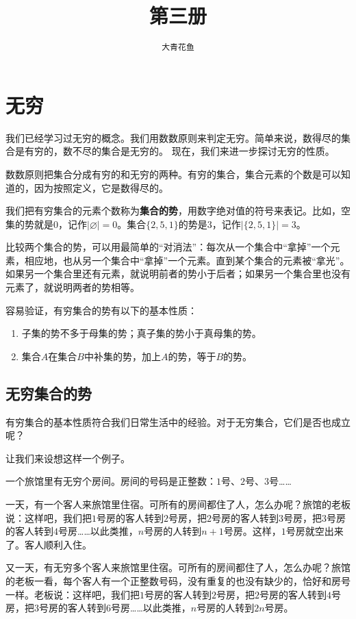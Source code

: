 \documentclass[12pt,UTF8]{ctexbook}
\title{\zihao{0} \bfseries 第三册}
\author{\zihao{2} \texttt{大青花鱼}}
\date{}
\begin{document}
\maketitle
\tableofcontents
\newpage

\chapter{无穷}

我们已经学习过无穷的概念。我们用数数原则来判定无穷。简单来说，数得尽的集合是有穷的，数不尽的集合是无穷的。
现在，我们来进一步探讨无穷的性质。

数数原则把集合分成有穷的和无穷的两种。有穷的集合，集合元素的个数是可以知道的，因为按照定义，它是数得尽的。

我们把有穷集合的元素个数称为\textbf{集合的势}，用数字绝对值的符号来表记。比如，空集的势就是$0$，记作$|\varnothing| = 0$。集合$\{2,5,1\}$的势是$3$，记作$|\{2, 5, 1\}| = 3$。

比较两个集合的势，可以用最简单的“对消法”：每次从一个集合中“拿掉”一个元素，相应地，也从另一个集合中“拿掉”一个元素。直到某个集合的元素被“拿光”。如果另一个集合里还有元素，就说明前者的势小于后者；如果另一个集合里也没有元素了，就说明两者的势相等。

容易验证，有穷集合的势有以下的基本性质：
\begin{enumerate}
    \item 子集的势不多于母集的势；真子集的势小于真母集的势。
    \item 集合$A$在集合$B$中补集的势，加上$A$的势，等于$B$的势。
\end{enumerate}

\section{无穷集合的势}

有穷集合的基本性质符合我们日常生活中的经验。对于无穷集合，它们是否也成立呢？

让我们来设想这样一个例子。

一个旅馆里有无穷个房间。房间的号码是正整数：$1$号、$2$号、$3$号……

一天，有一个客人来旅馆里住宿。可所有的房间都住了人，怎么办呢？旅馆的老板说：这样吧，我们把$1$号房的客人转到$2$号房，把$2$号房的客人转到$3$号房，把$3$号房的客人转到$4$号房……以此类推，$n$号房的人转到$n+1$号房。这样，$1$号房就空出来了。客人顺利入住。

又一天，有无穷多个客人来旅馆里住宿。可所有的房间都住了人，怎么办呢？旅馆的老板一看，每个客人有一个正整数号码，没有重复的也没有缺少的，恰好和房号一样。老板说：这样吧，我们把$1$号房的客人转到$2$号房，把$2$号房的客人转到$4$号房，把$3$号房的客人转到$6$号房……以此类推，$n$号房的人转到$2n$号房。
\end{document}
